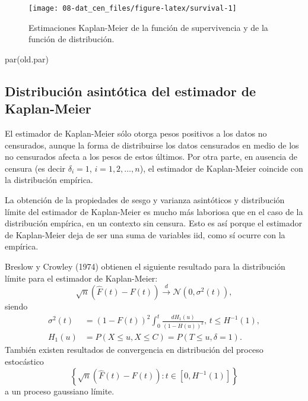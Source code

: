 \documentclass[
]{book}
\newenvironment{Shaded}{\begin{snugshade}}{\end{snugshade}}
\newcommand{\FunctionTok}[1]{\textcolor[rgb]{0.00,0.00,0.00}{#1}}
\newcommand{\NormalTok}[1]{#1}
\theoremstyle{break}
\theoremstyle{definition}
\theoremstyle{definition}
\theoremstyle{definition}
\theoremstyle{definition}
\theoremstyle{remark}
\begin{document}
\begin{figure}[!htb]

{\centering \texttt{[image: 08-dat\_cen\_files/figure-latex/survival-1]} 

}

\caption{Estimaciones Kaplan-Meier de la función de supervivencia y de la función de distribución.}\label{fig:survival}
\end{figure}

\begin{Shaded}
\begin{Highlighting}[]
\FunctionTok{par}\NormalTok{(old.par)}
\end{Highlighting}
\end{Shaded}

\hypertarget{distribuciuxf3n-asintuxf3tica-del-estimador-de-kaplan-meier}{%
\subsection{Distribución asintótica del estimador de Kaplan-Meier}\label{distribuciuxf3n-asintuxf3tica-del-estimador-de-kaplan-meier}}

El estimador de Kaplan-Meier sólo otorga pesos positivos a los datos no
censurados, aunque la forma de distribuirse los datos censurados en
medio de los no censurados afecta a los pesos de estos últimos. Por otra
parte, en ausencia de censura (es decir \(\delta _i=1\),
\(i=1,2,\ldots ,n\)), el estimador de Kaplan-Meier coincide con la
distribución empírica.

La obtención de la propiedades de sesgo y varianza asintóticos y
distribución límite del estimador de Kaplan-Meier es mucho más laboriosa
que en el caso de la distribución empírica, en un contexto sin censura.
Esto es así porque el estimador de Kaplan-Meier deja de ser una suma de
variables iid, como sí ocurre con la empírica.

Breslow y Crowley (1974) obtienen el siguiente resultado para la distribución
límite para el estimador de Kaplan-Meier:
\[\sqrt{n}\left( \hat{F}\left( t \right) -F\left( t \right) \right) 
\overset{d}{\longrightarrow} \mathcal{N}\left( 0,\sigma^2\left( t \right)
\right),\]
siendo
\[\begin{aligned}
\sigma^2\left( t \right) &= \left( 1-F\left( t \right) \right)
^2\int_{0}^{t}\frac{dH_1\left( u \right)}{\left( 1-H\left( u \right)
 \right)^2}\text{, }t\leq H^{-1}(1) , \\
H_1\left( u \right) &= P\left( X\leq u,X\leq C \right) =P\left( T\leq
u,\delta =1 \right).
\end{aligned}\]
También existen resultados de convergencia en distribución del
proceso estocástico
\[\left\{ \sqrt{n}\left( \hat{F}\left( t \right) - F\left( t \right)
 \right) : t \in \left[ 0,H^{-1}(1) \right] \right\}\]
a un proceso gaussiano límite.
\end{document}
